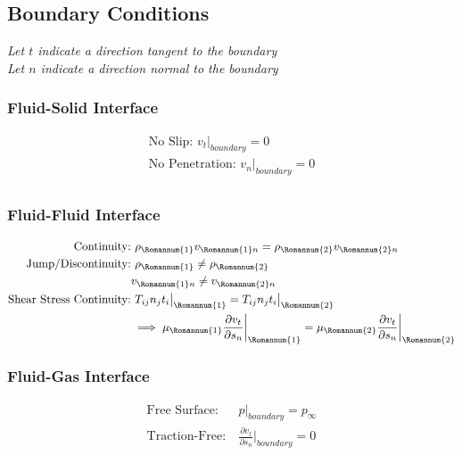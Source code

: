 \documentclass[11pt, letterpaper, notitlepage]{article}
\begin{document}
\subsection{Boundary Conditions} 
\textit{Let $t$ indicate a direction tangent to the boundary} \\
\textit{Let $n$ indicate a direction normal to the boundary}

\subsubsection{Fluid-Solid Interface}
\begin{align*}
\text{No Slip: } v_t\rvert_{boundary} = 0 \\
\text{No Penetration: } v_n\rvert_{boundary} = 0 \\
\end{align*}

\subsubsection{Fluid-Fluid Interface}
\begin{align*}
\text{Continuity:}& \ \rho_\Romannum{1} v_{\Romannum{1} n} = \rho_\Romannum{2} v_{\Romannum{2} n} \\
\text{Jump/Discontinuity:}& \ \rho_\Romannum{1} \neq \rho_\Romannum{2} \\
& v_{\Romannum{1} n} \neq v_{\Romannum{2} n} \\
\text{Shear Stress Continuity:}& \ T_{ij} n_j t_i \bigr\rvert_\Romannum{1} = T_{ij} n_j t_i \bigr\rvert_\Romannum{2} \\
& \implies \mu_\Romannum{1} \frac{\partial v_t}{\partial s_n} \biggr\rvert_\Romannum{1} = \mu_\Romannum{2} \frac{\partial v_t}{\partial s_n} \biggr\rvert_\Romannum{2}
\end{align*}

\subsubsection{Fluid-Gas Interface}
\begin{align*}
\text{Free Surface:}& \ p \rvert_{boundary} = p_{\infty} \\
\text{Traction-Free:}& \ \frac{\partial v_t}{\partial s_n} \biggr\rvert_{boundary} = 0 \\
\end{align*}

\newpage
\end{document}
